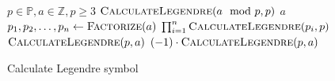 \documentclass{article}
\begin{document}
\begin{preview}
    \begin{algorithm}[H]
        \begin{algorithmic}
        \Require $p \in \mathbb{P}, a \in \mathbb{Z}, p \geq 3$
				\State \Return $\Call{CalculateLegendre}{a \mod p, p}$ 
				\State \Return $a$ 
			 
					\State {}
				\Else
					\State {}
				\EndIf	{}
			 
					\State {}
				\Else
					\State {}
				\EndIf {}
			 
				\State $p_1, p_2, \dots, p_n \gets \Call{Factorize}{a}$
				\State \Return $\prod_{i=1}^n \Call{CalculateLegendre}{p_i, p}$
			\Else {}
					\State \Return $\Call{CalculateLegendre}{p, a}$
				\Else
					\State \Return $(-1) \cdot \Call{CalculateLegendre}{p, a}$
				\EndIf
			\EndIf
		\EndProcedure
        \end{algorithmic}
    \caption{Calculate Legendre symbol}
    \label{alg:calculateLegendreSymbol}
    \end{algorithm}
\end{preview}
\end{document}
